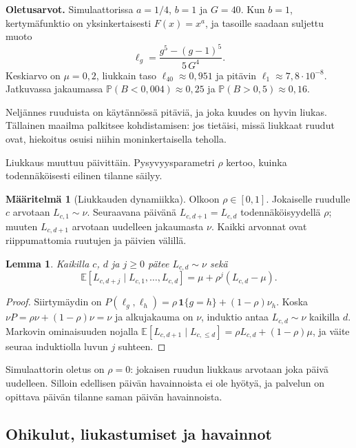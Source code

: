\documentclass[11pt,a4paper]{article}
\theoremstyle{plain}
\newtheorem{lemma}{Lemma}
\theoremstyle{definition}
\newtheorem{maaritelma}{Määritelmä}
\theoremstyle{remark}
\newcommand{\E}{\mathbb{E}}
\renewcommand{\P}{\mathbb{P}}
\newcommand{\1}{\mathbf{1}}
\begin{document}
\textbf{Oletusarvot.} Simulaattorissa $a = 1/4$, $b = 1$ ja $G = 40$. Kun
$b = 1$, kertymäfunktio on yksinkertaisesti $F(x) = x^{a}$, ja tasoille saadaan
suljettu muoto
\[
  \ell_g = \frac{g^5 - (g-1)^5}{5\, G^4}.
\]
Keskiarvo on $\mu = 0{,}2$, liukkain taso $\ell_{40} \approx 0{,}951$ ja
pitävin $\ell_1 \approx 7{,}8 \cdot 10^{-8}$. Jatkuvassa jakaumassa
$\P(B < 0{,}004) \approx 0{,}25$ ja $\P(B > 0{,}5) \approx 0{,}16$.

\begin{intuitio}
Neljännes ruuduista on käytännössä pitäviä, ja joka kuudes on hyvin liukas.
Tällainen maailma palkitsee kohdistamisen: jos tietäisi, missä liukkaat ruudut
ovat, hiekoitus osuisi niihin moninkertaisella teholla.
\end{intuitio}

Liukkaus muuttuu päivittäin. Pysyvyysparametri $\rho$ kertoo, kuinka
todennäköisesti eilinen tilanne säilyy.

\begin{maaritelma}[Liukkauden dynamiikka]\label{maar:dynamiikka}
Olkoon $\rho \in [0, 1]$. Jokaiselle ruudulle $c$ arvotaan $L_{c,1} \sim \nu$.
Seuraavana päivänä $L_{c,d+1} = L_{c,d}$ todennäköisyydellä $\rho$; muuten
$L_{c,d+1}$ arvotaan uudelleen jakaumasta $\nu$. Kaikki arvonnat ovat
riippumattomia ruutujen ja päivien välillä.
\end{maaritelma}

\begin{lemma}\label{le:markov}
Kaikilla $c$, $d$ ja $j \ge 0$ pätee $L_{c,d} \sim \nu$ sekä
\[
  \E[L_{c,d+j} \mid L_{c,1}, \dots, L_{c,d}] = \mu + \rho^j (L_{c,d} - \mu).
\]
\end{lemma}

\begin{proof}
Siirtymäydin on $P(\ell_g, \ell_h) = \rho\, \1\{g = h\} + (1-\rho)\nu_h$.
Koska $\nu P = \rho \nu + (1-\rho)\nu = \nu$ ja alkujakauma on $\nu$, induktio
antaa $L_{c,d} \sim \nu$ kaikilla $d$. Markovin ominaisuuden nojalla
$\E[L_{c,d+1} \mid L_{c,\le d}] = \rho L_{c,d} + (1-\rho)\mu$, ja väite seuraa
induktiolla luvun $j$ suhteen.
\end{proof}

Simulaattorin oletus on $\rho = 0$: jokaisen ruudun liukkaus arvotaan joka
päivä uudelleen. Silloin edellisen päivän havainnoista ei ole hyötyä, ja
palvelun on opittava päivän tilanne saman päivän havainnoista.

\subsection{Ohikulut, liukastumiset ja havainnot}
\end{document}
